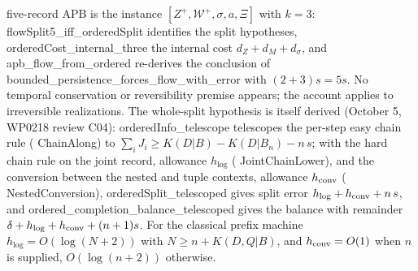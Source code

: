 \documentclass[11pt,a4paper]{article}
\newcommand{\lean}[1]{{\ttfamily\small
  \let\leanunderscore\_\def\_{\leanunderscore\allowbreak}#1}}
\begin{document}
\begin{itemize}[leftmargin=1.4em,itemsep=1pt]
five-record APB is the instance $[Z^+,\mathcal W^+,\sigma,a,\Xi]$ with $k=3$:
\lean{flowSplit5\_iff\_orderedSplit} identifies the split hypotheses,
\lean{orderedCost\_internal\_three} the internal cost $d_Z+d_M+d_\sigma$, and
\lean{apb\_flow\_from\_ordered} re-derives the conclusion of
\lean{bounded\_persistence\_forces\_flow\_with\_error} with $(2+3)s=5s$. No temporal
conservation or reversibility premise appears; the account applies to irreversible
realizations. The whole-split hypothesis is itself derived (October 5, WP0218 review C04):
\lean{orderedInfo\_telescope} telescopes the per-step easy chain rule (\lean{ChainAlong}) to
$\sum_iJ_i\ge K(D|B)-K(D|B_n)-n\,s$; with the hard chain rule on the joint record,
allowance $h_{\log}$ (\lean{JointChainLower}), and the conversion between the nested and tuple
contexts, allowance $h_{\rm conv}$ (\lean{NestedConversion}),
\lean{orderedSplit\_telescoped} gives split error $h_{\log}+h_{\rm conv}+n\,s$, and \lean{ordered\_completion\_balance\_telescoped} gives the balance with remainder
$\delta+h_{\log}+h_{\rm conv}+(n+1)s$. For the classical prefix machine $h_{\log}=O(\log(N+2))$
with $N\ge n+K(D,Q|B)$, and $h_{\rm conv}=O(1)$ when $n$ is supplied, $O(\log(n+2))$ otherwise.


\end{itemize}
\end{document}
